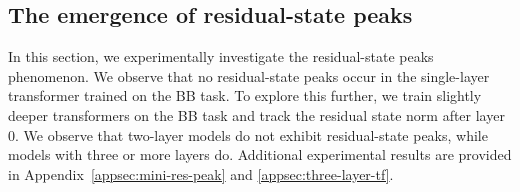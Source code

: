 \subsection{The emergence of residual-state peaks}
\label{sec:res-peak}
In this section, we experimentally investigate the residual-state peaks phenomenon. We observe that no residual-state peaks occur in the single-layer transformer trained on the BB task. To explore this further, we train slightly deeper transformers on the BB task and track the residual state norm after layer $0$. We observe that two-layer models do not exhibit residual-state peaks, while models with three or more layers do.
Additional experimental results are provided in Appendix~\ref{appsec:mini-res-peak} and \ref{appsec:three-layer-tf}. 


